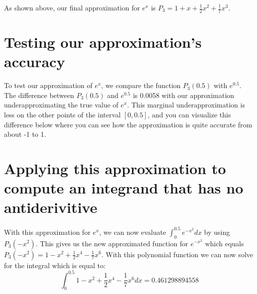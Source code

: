 \documentclass{report}
\begin{document}


As shown above, our final approximation for $e^x$ is $P_3=1 + x + \frac{1}{2}x^2 + \frac{1}{7}x^3$.

\section{Testing our approximation's accuracy}
To test our approximation of $ e^x $, we compare the function $P_3(0.5)$ with $e^{0.5}$. The difference between $P_3(0.5)$ and $e^{0.5}$ is 0.0058 with our approximation underapproximating the true value of $e^x$. This marginal underapproximation is less on the other points of the interval $ [0,0.5]$, and you can visualize this difference below where you can see how the approximation is quite accurate from about -1 to 1.



\section{Applying this approximation to compute an integrand that has no antiderivitive}

With this approximation for $e^x$, we can now evaluate $\int _0 ^{0.5} e^{-x^2} dx $ by using $ P_3(-x^2)$. This gives us the new approximated function for $ e^{-x^2} $ which equals $ P_3(-x^2) = 1 - x^2 + \frac{1}{2}x^4 - \frac{1}{7}x^6$. With this polynomial function we can now solve for the integral which is equal to:
$$ \int _0 ^{0.5} 1 - x^2 + \frac{1}{2}x^4 - \frac{1}{7}x^6 dx = 0.461298894558  $$
\end{document}
